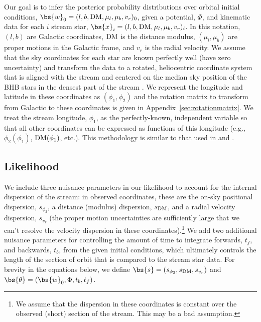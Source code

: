 \documentclass[letterpaper,12pt,preprint]{aastex}
\newcommand{\DM}{{\rm DM}}
\begin{document}
Our goal is to infer the posterior probability distributions over orbital initial conditions, $\bs{w}_0=(l, b, \DM, \mu_l, \mu_b, v_r)_0$, given a potential, $\Phi$, and kinematic data for each $i$ stream star, $\bs{x}_i=(l, b, \DM, \mu_l, \mu_b, v_r)_i$. In this notation, $(l, b)$ are Galactic coordinates, $\DM$ is the distance modulus, $(\mu_l, \mu_b)$ are proper motions in the Galactic frame, and $v_r$ is the radial velocity. We assume that the sky coordinates for each star are known perfectly well (have zero uncertainty) and transform the data to a rotated, heliocentric coordinate system that is aligned with the stream and centered on the median sky position of the BHB stars in the densest part of the stream \cite[all BHB stars except the `fanned' stars: cand15, cand26, cand49, cand54 from][]{sesar15b}. We represent the longitude and latitude in these coordinates as $(\phi_1, \phi_2)$ and the rotation matrix to transform from Galactic to these coordinates is given in Appendix~\ref{sec:rotationmatrix}. We treat the stream longitude, $\phi_1$, as the perfectly-known, independent variable so that all other coordinates can be expressed as functions of this longitude (e.g., $\phi_2(\phi_1)$, ${\rm DM}(\phi_1)$, etc.). This methodology is similar to that used in \cite{koposov10} and \cite{sesar15a}.

\subsection{Likelihood}

We include three nuisance parameters in our likelihood to account for the internal dispersion of the stream: in observed coordinates, these are the on-sky positional dispersion, $s_{\phi_2}$, a distance (modulus) dispersion, $s_{\DM}$, and a radial velocity dispersion, $s_{v_r}$ (the proper motion uncertainties are sufficiently large that we can't resolve the velocity dispersion in these coordinates).\footnote{We assume that the dispersion in these coordinates is constant over the observed (short) section of the stream. This may be a bad assumption.} We add two additional nuisance parameters for controlling the amount of time to integrate forwards, $t_f$, and backwards, $t_b$, from the given initial conditions, which ultimately controls the length of the section of orbit that is compared to the stream star data. For brevity in the equations below, we define $\bs{s} = (s_{\phi_2}, s_{\DM}, s_{v_r})$ and $\bs{\theta} = (\bs{w}_0, \Phi, t_b, t_f)$.
\end{document}
